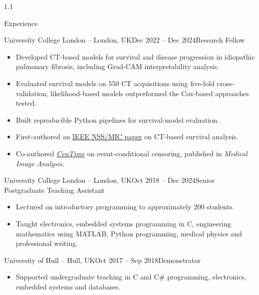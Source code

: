 \documentclass{cv}
\begin{document}
\begin{spacing}{1.1}
\begin{rSection}{Experience}
            \item \begin{rSubsection}{University College London \textnormal{-- London, UK}}{Dec 2022 -- Dec 2024}{Research Fellow}{}
                \item \begin{itemize}
                    \item Developed CT-based models for survival and disease progression in idiopathic pulmonary fibrosis, including Grad-CAM interpretability analysis.
                    \item Evaluated survival models on 550 CT acquisitions using five-fold cross-validation; likelihood-based models outperformed the Cox-based approaches tested.
                    \item Built reproducible Python pipelines for survival-model evaluation.
                    \item First-authored an \href{https://doi.org/10.1109/NSSMICRTSD49126.2023.10337922}{IEEE NSS/MIC paper} on CT-based survival analysis.
                    \item Co-authored \href{https://doi.org/10.1016/j.media.2023.103016}{\textit{CenTime}} on event-conditional censoring, published in \textit{Medical Image Analysis}.
                \end{itemize}
            \end{rSubsection}
        
            \item \begin{rSubsection}{University College London \textnormal{-- London, UK}}{Oct 2018 -- Dec 2024}{Senior Postgraduate Teaching Assistant}{}
                \item \begin{itemize}
                    \item Lectured on introductory programming to approximately 200 students.
                    \item Taught electronics, embedded systems programming in C, engineering mathematics using MATLAB, Python programming, medical physics and professional writing.
                \end{itemize}
            \end{rSubsection}
        
            \item \begin{rSubsection}{University of Hull \textnormal{-- Hull, UK}}{Oct 2017 -- Sep 2018}{Demonstrator}{}
                \item \begin{itemize}
                    \item Supported undergraduate teaching in C and C\# programming, electronics, embedded systems and databases.
                \end{itemize}
            \end{rSubsection}
        

\end{rSection}
\end{spacing}
\end{document}
